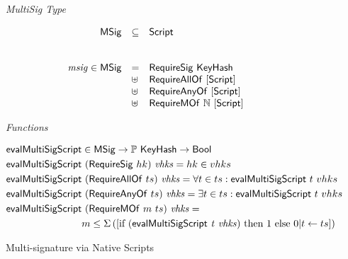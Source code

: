 \begin{figure*}[hbt]
  \emph{MultiSig Type}

  \begin{equation*}
    \begin{array}{rll}
      \mathsf{MSig} & \subseteq & \mathsf{Script} \\
      \\~\\
      \mathit{msig}\in\mathsf{MSig} & = & \mathsf{RequireSig}~\mathsf{KeyHash}\\
      & \uplus &
         \mathsf{RequireAllOf}~[\mathsf{Script}] \\
      & \uplus&
         \mathsf{RequireAnyOf}~[\mathsf{Script}] \\
      & \uplus&
        \mathsf{RequireMOf}~\mathbb{N}~[\mathsf{Script}]
    \end{array}
  \end{equation*}

  \emph{Functions}

  \begin{align*}
    \mathsf{evalMultiSigScript} & \in\mathsf{MSig}\to\mathbb{P}~\mathsf{KeyHash}\to\mathsf{Bool} & \\
    \mathsf{evalMultiSigScript} & ~(\mathsf{RequireSig}~hk)~\mathit{vhks} =  hk \in vhks \\
    \mathsf{evalMultiSigScript} & ~(\mathsf{RequireAllOf}~ts)~\mathit{vhks} =
                              \forall t \in ts: \mathsf{evalMultiSigScript}~t~vhks\\
    \mathsf{evalMultiSigScript} & ~(\mathsf{RequireAnyOf}~ts)~\mathit{vhks} =
                              \exists t \in ts: \mathsf{evalMultiSigScript}~t~vhks\\
    \mathsf{evalMultiSigScript} & ~(\mathsf{RequireMOf}~m~ts)~\mathit{vhks} = \\
                             & m \leq \Sigma
                               \left(
                               [\textrm{if}~(\mathsf{evalMultiSigScript}~\mathit{t}~\mathit{vhks})~
                               \textrm{then}~1~\textrm{else}~0\vert t \leftarrow ts]
                               \right)
  \end{align*}

  \caption{Multi-signature via Native Scripts}
  \label{fig:types-msig}
\end{figure*}

\clearpage
